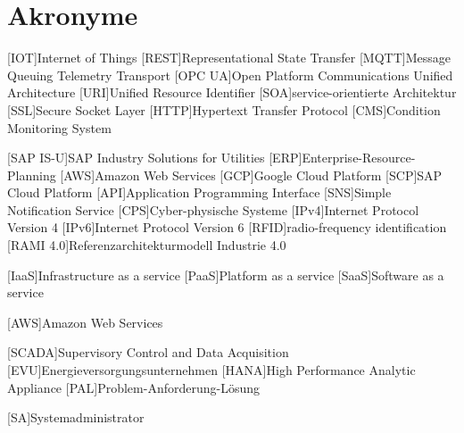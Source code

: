 \section*{Akronyme}            %
\begin{acronym}[SAP IS-U]
  [IOT]{Internet of Things}
  [REST]{Representational State Transfer}
  [MQTT]{Message Queuing Telemetry Transport}
  [OPC UA]{Open Platform Communications Unified Architecture}
  [URI]{Unified Resource Identifier}
  [SOA]{service-orientierte Architektur}
  [SSL]{Secure Socket Layer}
  [HTTP]{Hypertext Transfer Protocol}
  [CMS]{Condition Monitoring System}

  [SAP IS-U]{SAP Industry Solutions for Utilities}
  [ERP]{Enterprise-Resource-Planning}
  [AWS]{Amazon Web Services}
  [GCP]{Google Cloud Platform}
  [SCP]{SAP Cloud Platform}
  [API]{Application Programming Interface}
  [SNS]{Simple Notification Service}
  [CPS]{Cyber-physische Systeme}
  [IPv4]{Internet Protocol Version 4}
  [IPv6]{Internet Protocol Version 6}
  [RFID]{radio-frequency identification}
  [RAMI 4.0]{Referenzarchitekturmodell Industrie 4.0}

[IaaS]{Infrastructure as a service}
[PaaS]{Platform as a service}
[SaaS]{Software as a service}

[AWS]{Amazon Web Services}


[SCADA]{Supervisory Control and Data Acquisition}
[EVU]{Energieversorgungsunternehmen}
[HANA]{High Performance Analytic Appliance}
[PAL]{Problem-Anforderung-Lösung}

[SA]{Systemadministrator}

\end{acronym}

\newpage

\listoffigures
{}
\listoftables
{}
\lstlistoflistings
{}
\newpage
